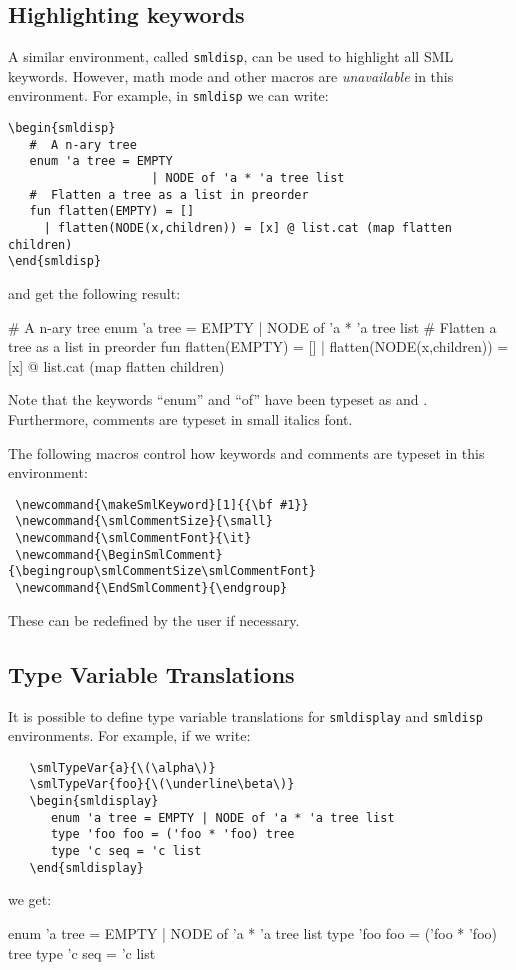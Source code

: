 \subsection{Highlighting keywords}
A similar environment, called \verb|smldisp|, can be used to highlight
all SML keywords.   However, math mode and other macros are {\em unavailable}
in this environment.  For example, in \verb|smldisp| we can write:
\begin{verbatim}
\begin{smldisp} 
   #  A n-ary tree 
   enum 'a tree = EMPTY 
                    | NODE of 'a * 'a tree list
   #  Flatten a tree as a list in preorder 
   fun flatten(EMPTY) = []
     | flatten(NODE(x,children)) = [x] @ list.cat (map flatten children)
\end{smldisp}
\end{verbatim}
and get the following result:
\begin{smldisp} 
   #  A n-ary tree 
   enum 'a tree = EMPTY 
                    | NODE of 'a * 'a tree list
   #  Flatten a tree as a list in preorder 
   fun flatten(EMPTY) = []
     | flatten(NODE(x,children)) = [x] @ list.cat (map flatten children)
\end{smldisp}

Note that the keywords ``enum'' and ``of'' have been typeset as
 and .  Furthermore, comments are typeset
in small italics font.   

The following macros control how keywords and comments are typeset
in this environment:
\begin{verbatim}
 \newcommand{\makeSmlKeyword}[1]{{\bf #1}}
 \newcommand{\smlCommentSize}{\small}
 \newcommand{\smlCommentFont}{\it}
 \newcommand{\BeginSmlComment}{\begingroup\smlCommentSize\smlCommentFont}
 \newcommand{\EndSmlComment}{\endgroup}
\end{verbatim}
These can be redefined by the user if necessary.

\subsection{Type Variable Translations}
It is possible to define type variable translations for
\verb|smldisplay| and \verb|smldisp| environments.  For example, 
if we write:
\begin{verbatim}
   \smlTypeVar{a}{\(\alpha\)}
   \smlTypeVar{foo}{\(\underline\beta\)}
   \begin{smldisplay} 
      enum 'a tree = EMPTY | NODE of 'a * 'a tree list
      type 'foo foo = ('foo * 'foo) tree
      type 'c seq = 'c list
   \end{smldisplay}
\end{verbatim}
we get:
   \begin{smldisplay} 
      enum 'a tree = EMPTY | NODE of 'a * 'a tree list
      type 'foo foo = ('foo * 'foo) tree
      type 'c seq = 'c list
   \end{smldisplay}

